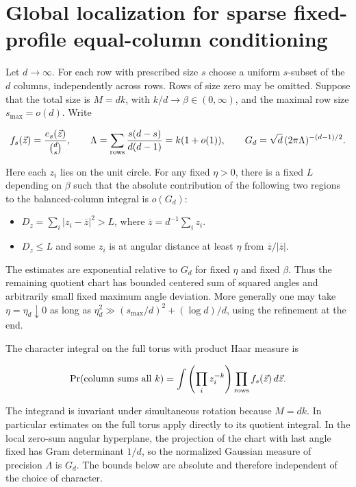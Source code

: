 \section{Global localization for sparse fixed-profile equal-column conditioning}\label{sec:sparse-fixed-profile-global-localization}

Let $d\to\infty$. For each row with prescribed size $s$ choose a uniform $s$-subset of the $d$ columns, independently across rows. Rows of size zero may be omitted. Suppose that the total size is $M=dk$, with $k/d\to\beta\in(0,\infty)$, and the maximal row size $s_{\max}=o(d)$. Write

\begin{equation*}
f_s(\vec z)=\frac{e_s(\vec z)}{\binom ds},\qquad
\Lambda=\sum_{\rm rows}\frac{s(d-s)}{d(d-1)}
       =k(1+o(1)),\qquad
G_d=\sqrt d\,(2\pi\Lambda)^{-(d-1)/2}.
\end{equation*}

Here each $z_i$ lies on the unit circle. For any fixed $\eta>0$, there is a fixed $L$ depending on $\beta$ such that the absolute contribution of the following two regions to the balanced-column integral is $o(G_d)$:

\begin{itemize}
\item $D_z=\sum_i|z_i-\overline z|^2>L$, where $\overline z=d^{-1}\sum_i z_i$.
\item $D_z\le L$ and some $z_i$ is at angular distance at least $\eta$ from $\overline z/|\overline z|$.
\end{itemize}

The estimates are exponential relative to $G_d$ for fixed $\eta$ and fixed $\beta$. Thus the remaining quotient chart has bounded centered sum of squared angles and arbitrarily small fixed maximum angle deviation. More generally one may take $\eta=\eta_d\downarrow0$ as long as $\eta_d^2\gg (s_{\max}/d)^2+(\log d)/d$, using the refinement at the end.

The character integral on the full torus with product Haar measure is

\begin{equation*}
\Pr(\text{column sums all }k)
=\int \left(\prod_i z_i^{-k}\right)\prod_{\rm rows} f_s(\vec z)\,d\vec z.
\end{equation*}

The integrand is invariant under simultaneous rotation because $M=dk$. In particular estimates on the full torus apply directly to its quotient integral. In the local zero-sum angular hyperplane, the projection of the chart with last angle fixed has Gram determinant $1/d$, so the normalized Gaussian measure of precision $\Lambda$ is $G_d$. The bounds below are absolute and therefore independent of the choice of character.

